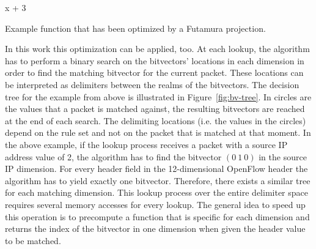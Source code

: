 \documentclass[a4paper,
		12pt,
		parskip=full,
		titlepage
		]{scrartcl}
\begin{document}
\begin{algorithm}
\begin{algorithmic}[1]
    \State \Return x + 3
\EndFunction
\end{algorithmic}
\caption{Example function that has been optimized by a Futamura projection.}
\label{alg:futamura-f-optimized}
\end{algorithm}

In this work this optimization can be applied, too.
At each lookup, the algorithm has to perform a binary search on the bitvectors' 
locations in each dimension in order to find the matching bitvector for the current packet.
These locations can be interpreted as delimiters between the realms of the bitvectors.
The decision tree for the example from above is illustrated in Figure~\ref{fig:bv-tree}.
In circles are the values that a packet is matched against, the resulting bitvectors are reached at the end of each search. 
The delimiting locations (i.e. the values in the circles) depend on the 
rule set and not on the packet that is matched at that moment.
In the above example, if the lookup process receives a packet with a source IP 
address value of 2, the algorithm has to find the bitvector $(0\ 1\ 0)$ in the source IP dimension.
For every header field in the 12-dimensional OpenFlow header the algorithm has to yield exactly one bitvector.
Therefore, there exists a similar tree for each matching dimension.
This lookup process over the entire delimiter space requires several memory accesses for every lookup.
The general idea to speed up this operation is to precompute a function that 
is specific for each dimension and returns the index of the bitvector in one 
dimension when given the header value to be matched.
\end{document}
